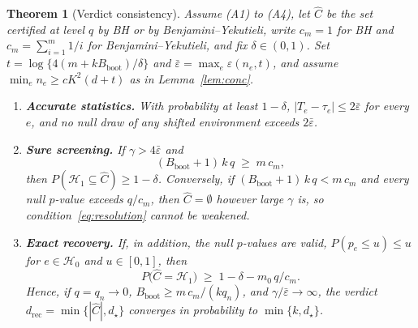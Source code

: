 \documentclass[11pt]{article}
\newtheorem{theorem}{Theorem}
\theoremstyle{remark}
\newcommand{\Hone}{\mathcal{H}_1}
\newcommand{\Hzero}{\mathcal{H}_0}
\newcommand{\Chat}{\widehat C}
\newcommand{\Bb}{B_{\mathrm{boot}}}
\begin{document}
\setcounter{theorem}{2}
\begin{theorem}[Verdict consistency]
\label{thm:consistency}
Assume (A1) to (A4), let $\Chat$ be the set certified at level $q$ by BH or by Benjamini--Yekutieli, write $c_m=1$ for BH and $c_m=\sum_{i=1}^m1/i$ for Benjamini--Yekutieli, and fix $\delta\in(0,1)$. Set $t=\log\{4(m+k\Bb)/\delta\}$ and $\bar\varepsilon=\max_e\varepsilon(n_e,t)$, and assume $\min_e n_e\ge cK^2(d+t)$ as in Lemma~\ref{lem:conc}.
\begin{enumerate}
  \item[(i)] \textbf{Accurate statistics.} With probability at least $1-\delta$, $|T_e-\tau_e|\le2\bar\varepsilon$ for every $e$, and no null draw of any shifted environment exceeds $2\bar\varepsilon$.
  \item[(ii)] \textbf{Sure screening.} If $\gamma>4\bar\varepsilon$ and
  \begin{equation}
    (\Bb+1)\,k\,q\;\ge\;m\,c_m,
    \label{eq:resolution}
  \end{equation}
  then $P(\Hone\subseteq\Chat)\ge1-\delta$. Conversely, if $(\Bb+1)\,k\,q<m\,c_m$ and every null $p$-value exceeds $q/c_m$, then $\Chat=\emptyset$ however large $\gamma$ is, so condition~\eqref{eq:resolution} cannot be weakened.
  \item[(iii)] \textbf{Exact recovery.} If, in addition, the null $p$-values are valid, $P(p_e\le u)\le u$ for $e\in\Hzero$ and $u\in[0,1]$, then
  \[
    P\bigl(\Chat=\Hone\bigr)\;\ge\;1-\delta-m_0\,q/c_m .
  \]
  Hence, if $q=q_n\to0$, $\Bb\ge m\,c_m/(kq_n)$, and $\gamma/\bar\varepsilon\to\infty$, the verdict $d_{\mathrm{rec}}=\min\{|\Chat|,d_\star\}$ converges in probability to $\min\{k,d_\star\}$.
\end{enumerate}
\end{theorem}
\end{document}

